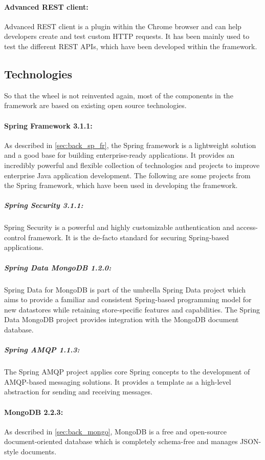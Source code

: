 \paragraph{Advanced REST client:\label{sec:impl_advanced_rest_cl}} Advanced \ac{REST} client is a plugin within the Chrome browser and can help developers create and test custom \ac{HTTP} requests. It has been mainly used to test the different \ac{REST} \ac{API}s, which have been developed within the framework.

\subsection{Technologies\label{sec:impl_technologies}}
So that the wheel is not reinvented again, most of the components in the framework are based on existing open source technologies. 

\paragraph{Spring Framework 3.1.1:\label{sec:impl_spring}} As described in \ref{sec:back_sp_fr}, the Spring framework is a lightweight solution and a good base for building enterprise-ready applications. It provides an incredibly powerful and flexible collection of technologies and projects to improve enterprise Java application development. The following are some projects from the Spring framework, which have been used in developing the framework.

\subparagraph{Spring Security 3.1.1:\label{sec:impl_spring_sec}} Spring Security is a powerful and highly customizable authentication and access-control framework. It is the de-facto standard for securing Spring-based applications.

\subparagraph{Spring Data MongoDB 1.2.0:\label{sec:impl_spring_data}} Spring Data for MongoDB is part of the umbrella Spring Data project which aims to provide a familiar and consistent Spring-based programming model for new datastores while retaining store-specific features and capabilities. The Spring Data MongoDB project provides integration with the MongoDB document database.

\subparagraph{Spring AMQP 1.1.3:\label{sec:impl_spring_amqp}} The Spring AMQP project applies core Spring concepts to the development of AMQP-based messaging solutions. It provides a template as a high-level abstraction for sending and receiving messages.

\paragraph{MongoDB 2.2.3:\label{sec:impl_mongo}} As described in \ref{sec:back_mongo}, MongoDB is a free and open-source document-oriented database which is completely schema-free and manages \ac{JSON}-style documents.

